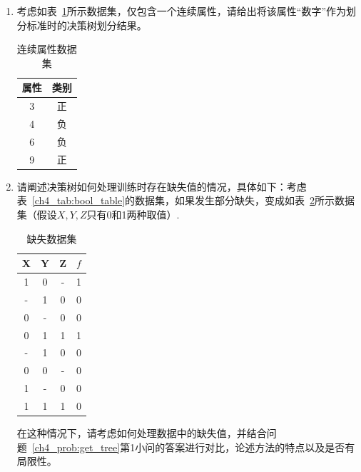 \documentclass[answers]{exam}  %
\begin{document}
\begin{questions}
  \begin{enumerate}
    \item
          考虑如表~\ref{ch4_tab:continuous_small_dataset}所示数据集，仅包含一个连续属性，请给出将该属性“数字”作为划分标准时的决策树划分结果。
          \begin{table}[h]
            \begin{center}
              \begin{tabular}{cc}
                \hline 属性 & 类别 \\
                \hline 3    & 正   \\
                4           & 负   \\
                6           & 负   \\
                9           & 正   \\
                \hline
              \end{tabular}
              \caption{连续属性数据集}\label{ch4_tab:continuous_small_dataset}
            \end{center}
          \end{table}
    \item 请阐述决策树如何处理训练时存在缺失值的情况，具体如下：考虑表~\ref{ch4_tab:bool_table}的数据集，如果发生部分缺失，变成如表~\ref{ch4_tab:missing_dataset}所示数据集（假设$X, Y, Z$只有0和1两种取值）.
          \begin{table}[ht]
            \centering
            \caption{缺失数据集}\label{ch4_tab:missing_dataset}
            \begin{tabular}{ccc|c}
              \hline X & Y & Z & $f$ \\
              \hline
              1        & 0 & - & 1   \\
              -        & 1 & 0 & 0   \\
              0        & - & 0 & 0   \\
              0        & 1 & 1 & 1   \\
              -        & 1 & 0 & 0   \\
              0        & 0 & - & 0   \\
              1        & - & 0 & 0   \\
              1        & 1 & 1 & 0   \\
              \hline
            \end{tabular}
          \end{table}
          在这种情况下，请考虑如何处理数据中的缺失值，并结合问题~\ref{ch4_prob:get_tree}第1小问的答案进行对比，论述方法的特点以及是否有局限性。

\end{enumerate}
\end{questions}
\end{document}
